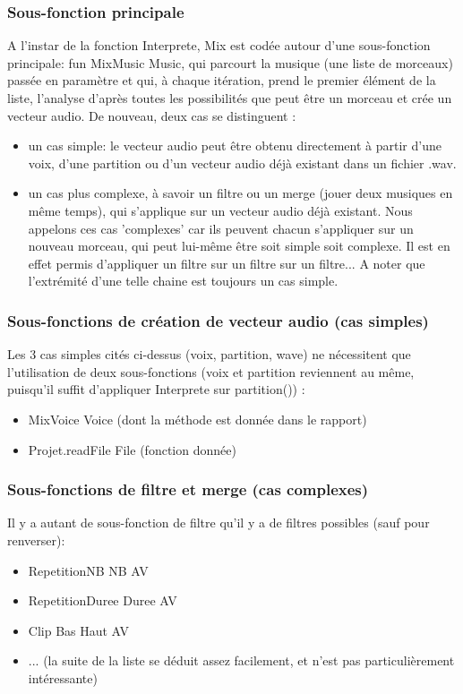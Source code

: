 \documentclass[10pt,a4paper]{article}
\begin{document}
\subsubsection{Sous-fonction principale}
A l'instar de la fonction Interprete, Mix est codée autour d'une sous-fonction principale: 
fun {MixMusic Music}, qui parcourt la musique (une liste de morceaux) passée en paramètre 
et qui, à chaque itération, prend le premier élément de la liste, l'analyse d'après toutes
 les possibilités que peut être un morceau et crée un vecteur audio. 
De nouveau, deux cas se distinguent :
\begin{itemize}
	\item un cas simple: le vecteur audio peut être obtenu directement à partir d'une voix, 
				d'une partition ou d'un vecteur audio déjà existant dans un fichier .wav.
	\item un cas plus complexe, à savoir un filtre ou un merge (jouer deux musiques en même temps),
				qui s'applique sur un vecteur audio déjà existant. Nous appelons ces cas 'complexes' car ils 
				peuvent chacun s'appliquer sur un nouveau morceau, qui peut lui-même être soit simple soit complexe.
				Il est en effet permis d'appliquer un filtre sur un filtre sur un filtre... A noter que l'extrémité 
				d'une telle chaine est toujours un cas simple.
\end{itemize}

\subsubsection{Sous-fonctions de création de vecteur audio (cas simples)}
Les 3 cas simples cités ci-dessus (voix, partition, wave)  ne nécessitent que l'utilisation
de deux sous-fonctions (voix et partition reviennent au même, puisqu'il suffit d'appliquer Interprete sur partition()) :
\begin{itemize}
	\item {MixVoice Voice} (dont la méthode est donnée dans le rapport)
	\item {Projet.readFile File} (fonction donnée)
\end{itemize}

\subsubsection{Sous-fonctions de filtre et merge (cas complexes)}
Il y a autant de sous-fonction de filtre qu'il y a de filtres possibles (sauf pour renverser):
\begin{itemize}
	\item  {RepetitionNB NB AV}
	\item {RepetitionDuree Duree AV}
	\item {Clip Bas Haut AV}
	\item ... (la suite de la liste se déduit assez facilement, et n'est pas particulièrement intéressante)
\end{itemize}
\end{document}
